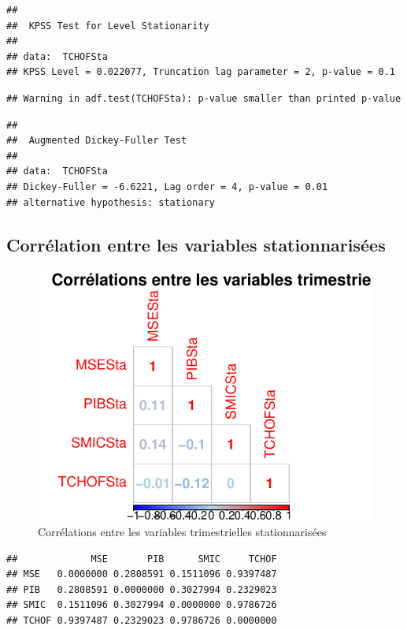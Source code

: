 \documentclass[11pt,]{article}
\begin{document}
\begin{verbatim}
## 
##  KPSS Test for Level Stationarity
## 
## data:  TCHOFSta
## KPSS Level = 0.022077, Truncation lag parameter = 2, p-value = 0.1
\end{verbatim}

\begin{verbatim}
## Warning in adf.test(TCHOFSta): p-value smaller than printed p-value
\end{verbatim}

\begin{verbatim}
## 
##  Augmented Dickey-Fuller Test
## 
## data:  TCHOFSta
## Dickey-Fuller = -6.6221, Lag order = 4, p-value = 0.01
## alternative hypothesis: stationary
\end{verbatim}

\newpage

\subsection{Corrélation entre les variables
stationnarisées}\label{correlation-entre-les-variables-stationnarisees}

\begin{figure}[htbp]
\centering
\includegraphics{doc_files/figure-latex/unnamed-chunk-23-1.pdf}
\caption{\label{fig19} Corrélations entre les variables trimestrielles
stationnarisées}
\end{figure}

\begin{verbatim}
##             MSE       PIB      SMIC     TCHOF
## MSE   0.0000000 0.2808591 0.1511096 0.9397487
## PIB   0.2808591 0.0000000 0.3027994 0.2329023
## SMIC  0.1511096 0.3027994 0.0000000 0.9786726
## TCHOF 0.9397487 0.2329023 0.9786726 0.0000000
\end{verbatim}
\end{document}
